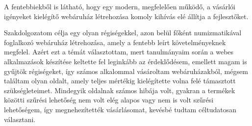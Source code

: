 A fentebbiekből is látható, hogy egy modern, megfelelően működő, a vásárlói igényeket kielégítő webáruház létrehozása komoly kihívás elé állítja a fejlesztőket. 

Szakdolgozatom célja egy olyan régiségekkel, azon belül főként numizmatikával foglalkozó webáruház létrehozása, amely a fentebb leírt követelményeknek megfelel. Azért ezt a témát választottam, mert tanulmányaim során a webes alkalmazások készítése keltette fel leginkább az érdeklődésem, emellett magam is gyűjtök régiségeket, így számos alkalommal vásároltam webáruházakból, mégsem találtam olyan oldalt, amely teljes mértékig kielégítette volna felé támasztott szükségleteimet. Mindegyik oldalnak számos hibája volt, gyakran a termékek közötti szűrési lehetőség nem volt elég alapos vagy nem is volt szűrési lehetőségem, így megnehezítették vásárlásomat, kevésbé tudtam céltudatosan választani. 
